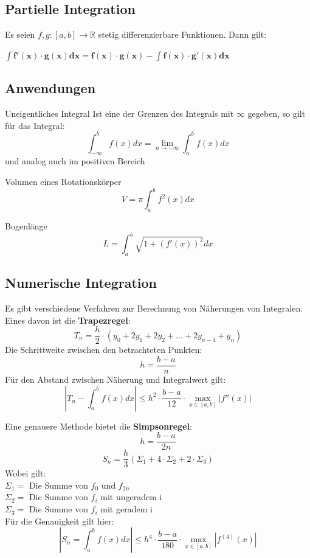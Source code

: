 \documentclass[german]{latex4ei/latex4ei_sheet}
\begin{document}
\begin{sectionbox}
\subsection{Partielle Integration}

	Es seien $f,g:[a,b]\rightarrow \mathbb{R}$ stetig differenzierbare Funktionen.
	Dann gilt:
	
	$\mathbf{\int f'(x) \cdot g(x) dx = f(x)\cdot g(x) - \int f(x) \cdot g'(x) dx}$
	
\subsection{Anwendungen}
\begin{cookbox} {Uneigentliches Integral}
Ist eine der Grenzen des Integrals mit $\infty$ gegeben, so gilt für das Integral: \\
$$\int_{-\infty}^{b} f(x)dx = \lim_{a\to-\infty}\int_{a}^{b}f(x)dx $$ 
und analog auch im positiven Bereich
    
\end{cookbox}

\end{sectionbox}
\begin{sectionbox}

\begin{cookbox}{Volumen eines Rotationskörper}
$$V = \pi\int_{a}^{b}f^2(x)dx$$
\end{cookbox}

\begin{cookbox}{Bogenlänge}
$$L = \int_{a}^{b}\sqrt{1+(f'(x))^2 } dx$$
\end{cookbox}

\subsection{Numerische Integration}
Es gibt verschiedene Verfahren zur Berechnung von Näherungen von Integralen. Eines davon ist die \textbf{Trapezregel}: 
$$T_n = \frac{h}{2}\cdot (y_0+2y_1+2y_2+ \dots + 2y_{n-1}+y_n)$$ 
Die Schrittweite zwischen den betrachteten Punkten: $$ h = \frac{b-a}{n}$$ 
Für den Abstand zwischen Näherung und Integralwert gilt: 
$$ | T_n - \int_{a}^{b}f(x) dx | \leq h^2 \cdot \frac{b-a}{12} \cdot \max_{x \in [a,b]}| f''(x) |
$$

Eine genauere Methode bietet die \textbf{Simpsonregel}: 
$$ h = \frac{b-a}{2n}$$ 
$$S_n = \frac{h}{3}(\Sigma_1 + 4 \cdot\Sigma_2 + 2 \cdot\Sigma_3 )$$
Wobei gilt: \\
$\Sigma_1 = $ Die Summe von $f_0$ und $f_{2n}$\\
$\Sigma_2 = $ Die Summe von $f_i$ mit ungeradem i\\
$\Sigma_3 = $ Die Summe von $f_i$ mit geradem i\\

Für die Genauigkeit gilt hier: 
$$ | S_n = \int_a^b f(x) dx | \leq h^4 \cdot \frac{b-a}{180} \cdot \max_{x \in [a,b] } | f^{(4)}(x)| $$ 


\end{sectionbox}
\end{document}
